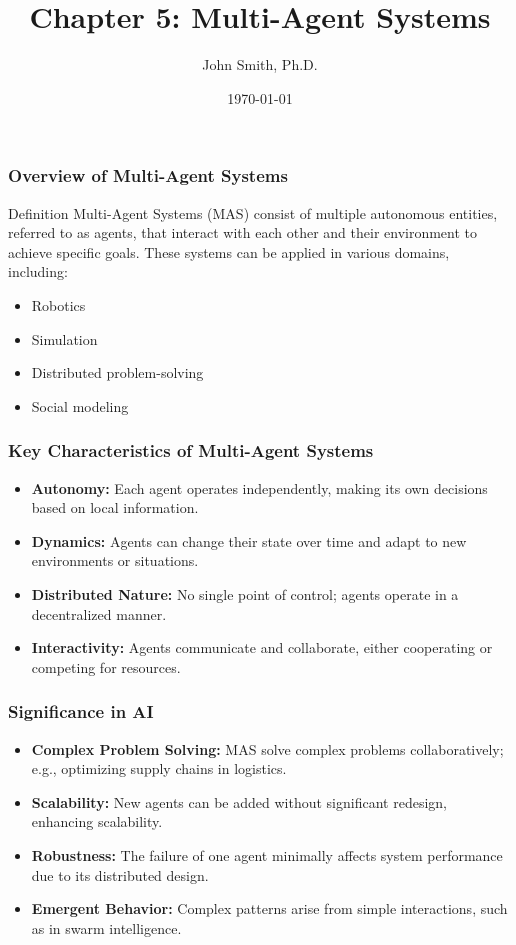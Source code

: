 \documentclass[aspectratio=169]{beamer}
\title[Multi-Agent Systems]{Chapter 5: Multi-Agent Systems}
\author[J. Smith]{John Smith, Ph.D.}
\institute[University Name]{
  Department of Computer Science\\
  University Name\\
  \vspace{0.3cm}
  Email: email@university.edu\\
  Website: www.university.edu
}
\date{\today}
\begin{document}
\frame{\titlepage}

\begin{frame}[fragile]
    \titlepage
\end{frame}

\begin{frame}[fragile]
    \frametitle{Overview of Multi-Agent Systems}
    \begin{block}{Definition}
        Multi-Agent Systems (MAS) consist of multiple autonomous entities, referred to as agents, that interact with each other and their environment to achieve specific goals. These systems can be applied in various domains, including:
    \end{block}
    \begin{itemize}
        \item Robotics
        \item Simulation
        \item Distributed problem-solving
        \item Social modeling
    \end{itemize}
\end{frame}

\begin{frame}[fragile]
    \frametitle{Key Characteristics of Multi-Agent Systems}
    \begin{itemize}
        \item \textbf{Autonomy:} Each agent operates independently, making its own decisions based on local information.
        \item \textbf{Dynamics:} Agents can change their state over time and adapt to new environments or situations.
        \item \textbf{Distributed Nature:} No single point of control; agents operate in a decentralized manner.
        \item \textbf{Interactivity:} Agents communicate and collaborate, either cooperating or competing for resources.
    \end{itemize}
\end{frame}

\begin{frame}[fragile]
    \frametitle{Significance in AI}
    \begin{itemize}
        \item \textbf{Complex Problem Solving:} MAS solve complex problems collaboratively; e.g., optimizing supply chains in logistics.
        \item \textbf{Scalability:} New agents can be added without significant redesign, enhancing scalability.
        \item \textbf{Robustness:} The failure of one agent minimally affects system performance due to its distributed design.
        \item \textbf{Emergent Behavior:} Complex patterns arise from simple interactions, such as in swarm intelligence.
    \end{itemize}
\end{frame}
\end{document}
